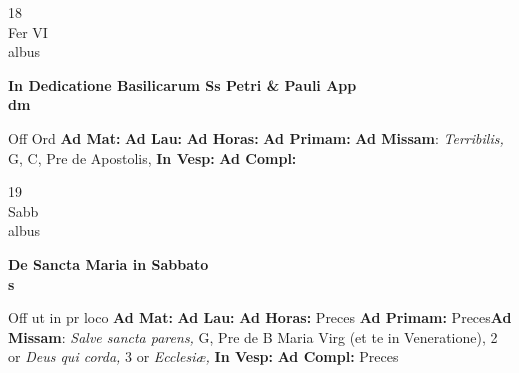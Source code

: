 \documentclass[10pt, openany]{book}
\begin{document}
    \begin{center}
        \begin{minipage}{3.5in}
            \vspace{2em}
            \begin{minipage}{0.5in}
                {\Huge 18} \\
                {\normalsize Fer VI} \\
                {\normalsize albus}
            \end{minipage}
            \begin{minipage}{3.0in}
                \textbf{ \large In Dedicatione Basilicarum Ss Petri \& Pauli App \\
                \textnormal{\normalsize dm}} \\ 
            \end{minipage}
            \begin{justify}Off Ord
                \textbf{Ad Mat: }
                \textbf{Ad Lau: }
                \textbf{Ad Horas: }
                \textbf{Ad Primam: }\textbf{Ad Missam}: \textit{Terribilis,} G, C, Pre de Apostolis,  
                \textbf{In Vesp: }
                \textbf{Ad Compl: }
            \end{justify}
        \end{minipage}
    \end{center}

    \begin{center}
        \begin{minipage}{3.5in}
            \vspace{2em}
            \begin{minipage}{0.5in}
                {\Huge 19} \\
                {\normalsize Sabb} \\
                {\normalsize albus}
            \end{minipage}
            \begin{minipage}{3.0in}
                \textbf{ \large De Sancta Maria in Sabbato \\
                \textnormal{\normalsize s}} \\ 
            \end{minipage}
            \begin{justify}Off ut in pr loco
                \textbf{Ad Mat: }
                \textbf{Ad Lau: }
                \textbf{Ad Horas: }Preces
                \textbf{Ad Primam: }Preces\textbf{Ad Missam}: \textit{Salve sancta parens,} G, Pre de B Maria Virg (et te in Veneratione), 2 or \textit{Deus qui corda,} 3 or \textit{Ecclesiæ,}  
                \textbf{In Vesp: }
                \textbf{Ad Compl: }Preces
            \end{justify}
        \end{minipage}
    \end{center}
\end{document}
